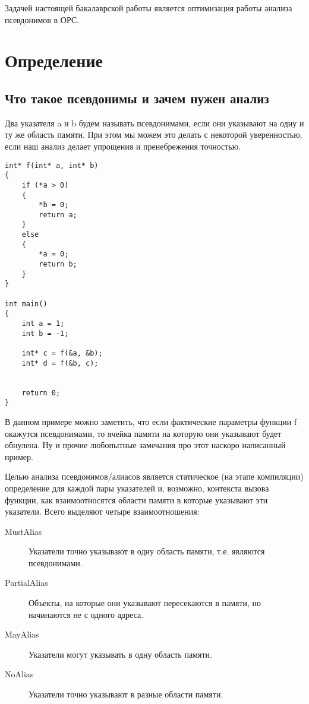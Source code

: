 





\Intro

Задачей настоящей бакалаврской работы является оптимизация работы анализа псевдонимов в ОРС.

\section{Определение}
\label{sec:examples}

\subsection{Что такое псевдонимы и зачем нужен анализ}

Два указателя a и b будем называть псевдонимами, если они указывают на одну и ту же область памяти. При этом мы можем это делать с некоторой уверенностью, если наш анализ делает упрощения и пренебрежения точностью.

\begin{lstlisting}
int* f(int* a, int* b)
{
    if (*a > 0)
    {
        *b = 0;
        return a;
    }
    else
    {
        *a = 0;
        return b;
    }
}

int main()
{
    int a = 1;
    int b = -1;
    
    int* c = f(&a, &b);
    int* d = f(&b, c);
    
    
    return 0;
}
\end{lstlisting}

В данном примере можно заметить, что если фактические параметры функции f окажутся псевдонимами, то ячейка памяти на которую они указывают будет обнулена. Ну и прочие любопытные замечания про этот наскоро написанный пример.

Целью анализа псевдонимов/алиасов является статическое (на этапе компиляции) определение для каждой пары указателей и, возможно, контекста вызова функции, как взаимоотносятся области памяти в которые указывают эти указатели. Всего выделяют четыре взаимоотношения:
\begin{description}
  \item[MustAlias] Указатели точно указывают в одну область памяти, т.е. являются псевдонимами.
  \item[PartialAlias] Объекты, на которые они указывают пересекаются в памяти, но начинаются не с одного адреса.
  \item[MayAlias] Указатели могут указывать в одну область памяти.
  \item[NoAlias] Указатели точно указывают в разные области памяти.
\end{description}

